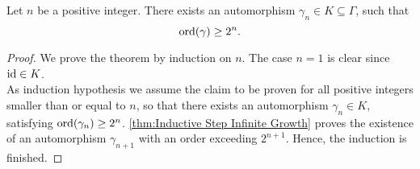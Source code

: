 \begin{thm}\label{thm:infinite growth}
Let $n$ be a positive integer. There exists an automorphism $\gamma_{n}\in K\subseteq\Gamma$, such that
\begin{equation*}
\operatorname{\mathrm{ord}}(\gamma)\geq 2^n.
\end{equation*}
\end{thm}

\begin{proof}
We prove the theorem by induction on $n$. The case $n=1$ is clear since $\operatorname{id}\in K$.\\
As induction hypothesis we assume the claim to be proven for all positive integers smaller than or equal to $n$, so that there exists an automorphism $\gamma_n\in K$, satisfying $\operatorname{\mathrm{ord}}(\gamma_n)\geq 2^n$. \cref{thm:Inductive Step Infinite Growth} proves the existence of an automorphism $\gamma_{n+1}$ with an order exceeding $2^{n+1}$. Hence, the induction is finished.
\end{proof}
